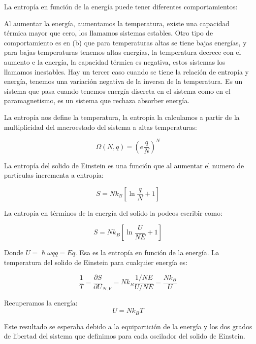 \documentclass[11pt,fleqn]{book}
\begin{document}
La entropía en función de la energía puede tener diferentes comportamientos:


Al aumentar la energía, aumentamos la temperatura, existe una capacidad térmica mayor que cero, los llamamos sistemas estables. Otro tipo de comportamiento es en (b)  que para temperaturas altas se tiene bajas energías, y para bajas temperaturas tenemos altas energías, la temperatura decrece con el aumento e la energía, la capacidad térmica es negativa, estos sistemas los llamamos inestables. Hay un tercer caso cuando se tiene la relación de entropía y energía, tenemos una variación negativa de la inversa de la temperatura. Es un sistema que pasa cuando tenemos energía discreta en el sistema como en el paramagnetismo, es un sistema que rechaza absorber energía. 


\begin{example}
La entropía nos define la temperatura, la entropía la calculamos a partir de la multiplicidad del macroestado del sistema a altas temperaturas:

\begin{equation*}
    \Omega(N,q)=\left(e\frac{q}{N}\right)^{N}
\end{equation*}

La entropía del solido de Einstein es una función que al aumentar el numero de partículas incrementa a entropía:

\begin{equation*}
    S=Nk_{B}\left[\ln\frac{q}{N}+1\right]
\end{equation*}

La entropía en términos de la energía del solido la podeos escribir como:

\begin{equation*}
      S=Nk_{B}\left[\ln\frac{U}{NE}+1\right]
\end{equation*}

Donde $U=\hslash\omega qq=Eq$. Esa es la entropía en función de la energía. La temperatura del solido de Einstein para cualquier energía es:

\begin{equation*}
    \frac{1}{T}=\frac{\partial S}{\partial U}_{N,V}=Nk_{B}\frac{1/NE}{U/NE}=\frac{Nk_{B}}{U}
\end{equation*}

Recuperamos la energía:
\begin{equation}
    U=Nk_{B}T
    \label{Eq. 3.25}
\end{equation}

Este resultado se esperaba debido a la equipartición de la energía y los dos grados de libertad del sistema que definimos para cada oscilador del solido de Einstein.
\end{example}
\end{document}
